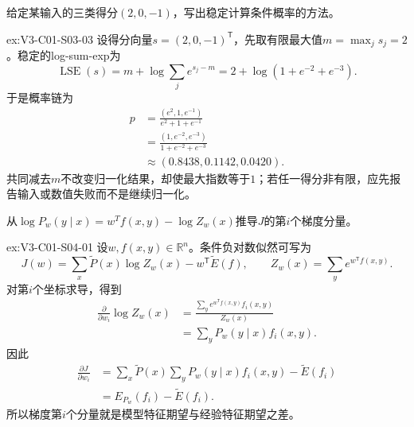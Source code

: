 \begin{SLChapterExercisePairSection}
\begin{exercise}\label{ex:V3-C01-S03-03}
给定某输入的三类得分$(2,0,-1)$，写出稳定计算条件概率的方法。
\end{exercise}
\ifSLFullEdition
{}\label{sol:V3-C01-S03-03}
\begin{chapterexercisesolution}{ex:V3-C01-S03-03}
设得分向量$s=(2,0,-1)^{\mathsf T}$，先取有限最大值$m=\max_j s_j=2$。稳定的log-sum-exp为
\[
\operatorname{LSE}(s)
=m+\log\sum_j e^{s_j-m}
=2+\log(1+e^{-2}+e^{-3}).
\]
于是概率链为
\[
\begin{aligned}
p
&=\frac{(e^2,1,e^{-1})}{e^2+1+e^{-1}}\\
&=\frac{(1,e^{-2},e^{-3})}{1+e^{-2}+e^{-3}}\\
&\approx(0.8438,0.1142,0.0420).
\end{aligned}
\]
共同减去$m$不改变归一化结果，却使最大指数等于$1$；若任一得分非有限，应先报告输入或数值失败而不是继续归一化。
\end{chapterexercisesolution}
\fi

\begin{exercise}\label{ex:V3-C01-S04-01}
从$\log P_w(y\mid x)=w^Tf(x,y)-\log Z_w(x)$推导$J$的第$i$个梯度分量。
\end{exercise}
\ifSLFullEdition
{}\label{sol:V3-C01-S04-01}
\begin{chapterexercisesolution}{ex:V3-C01-S04-01}
设$w,f(x,y)\in\mathbb R^n$。条件负对数似然可写为
\[
J(w)=\sum_x\widetilde P(x)\log Z_w(x)-w^{\mathsf T}\widetilde E(f),
\qquad
Z_w(x)=\sum_y e^{w^{\mathsf T}f(x,y)}.
\]
对第$i$个坐标求导，得到
\[
\begin{aligned}
\frac{\partial}{\partial w_i}\log Z_w(x)
&=\frac{\sum_y e^{w^{\mathsf T}f(x,y)}f_i(x,y)}{Z_w(x)}\\
&=\sum_yP_w(y\mid x)f_i(x,y).
\end{aligned}
\]
因此
\[
\begin{aligned}
\frac{\partial J}{\partial w_i}
&=\sum_x\widetilde P(x)\sum_yP_w(y\mid x)f_i(x,y)-\widetilde E(f_i)\\
&=E_{P_w}(f_i)-\widetilde E(f_i).
\end{aligned}
\]
所以梯度第$i$个分量就是模型特征期望与经验特征期望之差。
\end{chapterexercisesolution}
\fi


\end{SLChapterExercisePairSection}
